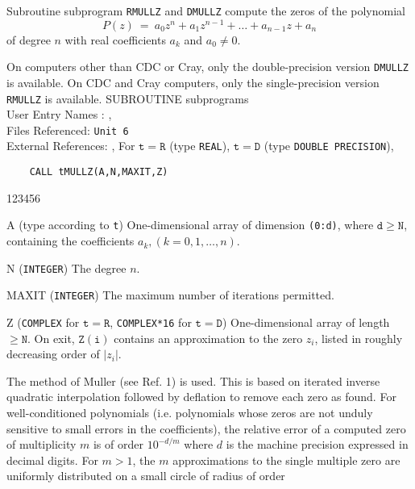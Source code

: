                   
         
         
Subroutine subprogram {\tt RMULLZ} and {\tt DMULLZ} compute the
zeros of the polynomial
$$ P(z) \ = \ a_0z^n + a_1z^{n-1} +\ldots +a_{n-1}z + a_n $$
of degree $n$ with real coefficients $a_k$ and $a_0 \ne 0$.
\par
On computers other than CDC or Cray, only
the double-precision version {\tt DMULLZ} is available.
On CDC and  Cray computers, only the single-precision version
{\tt RMULLZ} is available.
\Structure
SUBROUTINE subprograms \\
User Entry  Names : ,  \\
Files Referenced: {\tt Unit 6} \\
External References: , 
\Usage
For $\mathtt{t=R}$ (type {\tt REAL}), $\mathtt{t=D}$ (type
{\tt DOUBLE PRECISION}),
\begin{verbatim}
    CALL tMULLZ(A,N,MAXIT,Z)
\end{verbatim}
\begin{DLtt}{123456}
\item[A] (type according to {\tt t}) One-dimensional array of dimension
{\tt (0:d)}, where $\mathtt{d \ge N}$, containing the coefficients
$a_k, (k = 0,1,\ldots,n)$.
\item[N] ({\tt INTEGER}) The degree $n$.
\item[MAXIT] ({\tt INTEGER}) The maximum number of iterations permitted.
\item[Z] ({\tt COMPLEX} for $\mathtt{t=R}$, {\tt COMPLEX*16} for
$\mathtt{t=D}$) One-dimensional array of length
$\mathtt{\ge N}$. On exit, $\mathtt{Z(i)}$ contains an approximation
to the zero $z_i$, listed in roughly decreasing order of $|z_i|$.
\end{DLtt}
\Method
The method of Muller (see Ref. 1) is used. This is based on iterated
inverse quadratic interpolation followed by deflation to remove
each zero as found.
\Accuracy
For well-conditioned polynomials (i.e. polynomials whose zeros
are not unduly sensitive to small errors in the coefficients), the
relative error of a computed zero of multiplicity $m$ is of order
$10^{-d/m}$ where $d$ is the machine precision expressed in decimal
digits. For $m>1$, the $m$ approximations to the single multiple zero
are uniformly distributed on a small circle of radius of order
